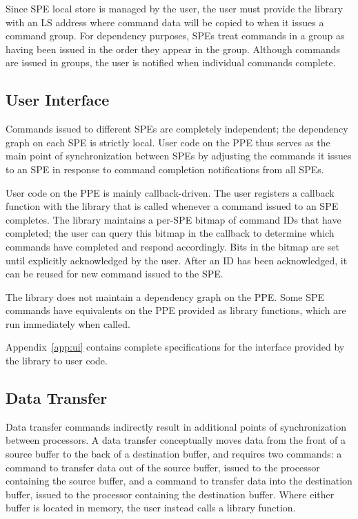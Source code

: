 Since SPE local store is managed by the user, the user must provide the library with an LS address where command data will be copied to when it issues a command group. For dependency purposes, SPEs treat commands in a group as having been issued in the order they appear in the group. Although commands are issued in groups, the user is notified when individual commands complete.

\subsection{User Interface}

Commands issued to different SPEs are completely independent; the dependency graph on each SPE is strictly local. User code on the PPE thus serves as the main point of synchronization between SPEs by adjusting the commands it issues to an SPE in response to command completion notifications from all SPEs.

User code on the PPE is mainly callback-driven. The user registers a callback function with the library that is called whenever a command issued to an SPE completes. The library maintains a per-SPE bitmap of command IDs that have completed; the user can query this bitmap in the callback to determine which commands have completed and respond accordingly. Bits in the bitmap are set until explicitly acknowledged by the user. After an ID has been acknowledged, it can be reused for new command issued to the SPE.

The library does not maintain a dependency graph on the PPE. Some SPE commands have equivalents on the PPE provided as library functions, which are run immediately when called.

Appendix~\ref{app:ui} contains complete specifications for the interface provided by the library to user code.

\subsection{Data Transfer}

Data transfer commands indirectly result in additional points of synchronization between processors. A data transfer conceptually moves data from the front of a source buffer to the back of a destination buffer, and requires two commands: a command to transfer data out of the source buffer, issued to the processor containing the source buffer, and a command to transfer data into the destination buffer, issued to the processor containing the destination buffer. Where either buffer is located in memory, the user instead calls a library function.

